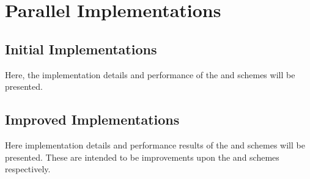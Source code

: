 \chapter{Parallel Implementations}
\label{sec:parallel_implementations}



\section{Initial Implementations}
Here, the implementation details and performance of the
\replicateddata{} and \systolicloop{} schemes will be presented.




\section{Improved Implementations}
Here implementation details and performance results of
the \sharedandreplicateddata{} and \replicatedsystolicloop{}
schemes will be presented.
%
These are intended to be improvements upon the \replicateddata{}
and \systolicloop{} schemes respectively.


